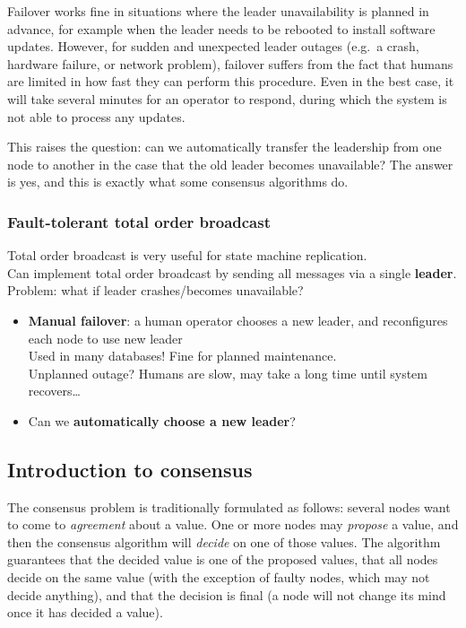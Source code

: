 Failover works fine in situations where the leader unavailability is planned in advance, for example when the leader needs to be rebooted to install software updates.
However, for sudden and unexpected leader outages (e.g.\ a crash, hardware failure, or network problem), failover suffers from the fact that humans are limited in how fast they can perform this procedure.
Even in the best case, it will take several minutes for an operator to respond, during which the system is not able to process any updates.

This raises the question: can we automatically transfer the leadership from one node to another in the case that the old leader becomes unavailable?
The answer is yes, and this is exactly what some consensus algorithms do.


\begin{frame}
    \label{s:failover}
    \frametitle{Fault-tolerant total order broadcast}
    Total order broadcast is very useful for state machine replication.\\[0.5em]
    Can implement total order broadcast by sending all messages via a single \textbf{leader}.\\[0.5em]
    Problem: what if leader crashes/becomes unavailable?\\\pause
    \begin{itemize}
        \item \textbf{Manual failover}: a human operator chooses a new leader, and reconfigures each node to use new leader\\[0.5em]
            Used in many databases! Fine for planned maintenance.\\[0.5em]\pause
            Unplanned outage? Humans are slow, may take a long time until system recovers\dots\\[0.5em]\pause
        \item Can we \textbf{automatically choose a new leader}?
    \end{itemize}
\end{frame}
\label{l:failover}

\subsection{Introduction to consensus}

The consensus problem is traditionally formulated as follows: several nodes want to come to \emph{agreement} about a value.
One or more nodes may \emph{propose} a value, and then the consensus algorithm will \emph{decide} on one of those values.
The algorithm guarantees that the decided value is one of the proposed values, that all nodes decide on the same value (with the exception of faulty nodes, which may not decide anything), and that the decision is final (a node will not change its mind once it has decided a value).

